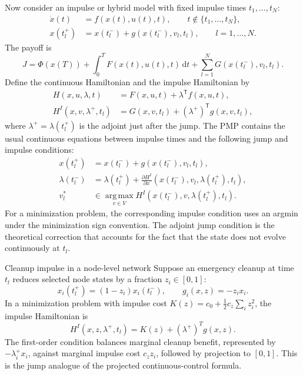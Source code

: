 \documentclass[11pt,a4paper]{article}
\newcommand{\dd}{\,\mathrm{d}}
\newcommand{\argmax}{\operatorname*{arg\,max}}
\newcommand{\T}{\mathsf{T}}
\begin{document}
Now consider an impulse or hybrid model with fixed impulse times $t_1,\dots,t_N$:
\begin{align}
  \dot{x}(t)&=f(x(t),u(t),t),\qquad t\notin\{t_1,\dots,t_N\},\\
  x(t_l^+)&=x(t_l^-)+g(x(t_l^-),v_l,t_l),\qquad l=1,\dots,N.
\end{align}
The payoff is
\begin{equation}
  J=\Phi(x(T))+\int_0^T F(x(t),u(t),t)\dd t
  +\sum_{l=1}^N G(x(t_l^-),v_l,t_l).
\end{equation}
Define the continuous Hamiltonian and the impulse Hamiltonian by
\begin{align}
  H(x,u,\lambda,t)&=F(x,u,t)+\lambda^{\T}f(x,u,t),\\
  H^I(x,v,\lambda^+,t_l)&=G(x,v,t_l)+(\lambda^+)^{\T}g(x,v,t_l),
\end{align}
where $\lambda^+=\lambda(t_l^+)$ is the adjoint just after the jump. The PMP contains the usual continuous equations between impulse times and the following jump and impulse conditions:
\begin{align}
  x(t_l^+)&=x(t_l^-)+g(x(t_l^-),v_l,t_l),\\
  \lambda(t_l^-)&=\lambda(t_l^+)+\frac{\partial H^I}{\partial x}(x(t_l^-),v_l,\lambda(t_l^+),t_l),\\
  v_l^*&\in\argmax_{v\in V}H^I(x(t_l^-),v,\lambda(t_l^+),t_l).
  \label{eq:impulse-magnitude}
\end{align}
For a minimization problem, the corresponding impulse condition uses an argmin under the minimization sign convention. The adjoint jump condition is the theoretical correction that accounts for the fact that the state does not evolve continuously at $t_l$.



\begin{examplebox}{Cleanup impulse in a node-level network}
Suppose an emergency cleanup at time $t_l$ reduces selected node states by a fraction $z_i\in[0,1]$:
\begin{equation}
  x_i(t_l^+)=(1-z_i)x_i(t_l^-),\qquad g_i(x,z)=-z_i x_i.
\end{equation}
In a minimization problem with impulse cost $K(z)=c_0+\frac{1}{2}c_z\sum_i z_i^2$, the impulse Hamiltonian is
\begin{equation}
  H^I(x,z,\lambda^+,t_l)=K(z)+(\lambda^+)^T g(x,z).
\end{equation}
The first-order condition balances marginal cleanup benefit, represented by $-\lambda_i^+x_i$, against marginal impulse cost $c_z z_i$, followed by projection to $[0,1]$. This is the jump analogue of the projected continuous-control formula.
\end{examplebox}
\end{document}
